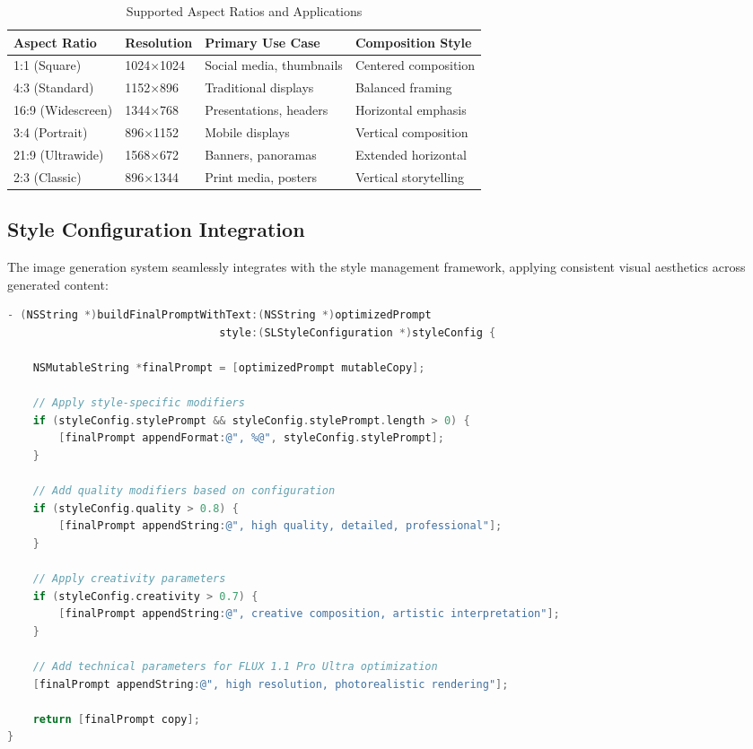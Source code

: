 \begin{table}[H]
\centering
\caption{Supported Aspect Ratios and Applications}
\label{tab:aspect_ratios}
{\begin{tabular}{llll}
\toprule
\textbf{Aspect Ratio} & \textbf{Resolution} & \textbf{Primary Use Case} & \textbf{Composition Style} \\
\midrule
1:1 (Square) & 1024×1024 & Social media, thumbnails & Centered composition \\
4:3 (Standard) & 1152×896 & Traditional displays & Balanced framing \\
16:9 (Widescreen) & 1344×768 & Presentations, headers & Horizontal emphasis \\
3:4 (Portrait) & 896×1152 & Mobile displays & Vertical composition \\
21:9 (Ultrawide) & 1568×672 & Banners, panoramas & Extended horizontal \\
2:3 (Classic) & 896×1344 & Print media, posters & Vertical storytelling \\
\bottomrule
\end{tabular}}
\end{table}

\subsection{Style Configuration Integration}

The image generation system seamlessly integrates with the style management framework, applying consistent visual aesthetics across generated content:

\begin{lstlisting}[language=C,basicstyle=\footnotesize\ttfamily,frame=single,breaklines=true,columns=flexible,caption={Style Configuration Application},label={lst:style_integration}]
- (NSString *)buildFinalPromptWithText:(NSString *)optimizedPrompt 
                                 style:(SLStyleConfiguration *)styleConfig {
    
    NSMutableString *finalPrompt = [optimizedPrompt mutableCopy];
    
    // Apply style-specific modifiers
    if (styleConfig.stylePrompt && styleConfig.stylePrompt.length > 0) {
        [finalPrompt appendFormat:@", %@", styleConfig.stylePrompt];
    }
    
    // Add quality modifiers based on configuration
    if (styleConfig.quality > 0.8) {
        [finalPrompt appendString:@", high quality, detailed, professional"];
    }
    
    // Apply creativity parameters
    if (styleConfig.creativity > 0.7) {
        [finalPrompt appendString:@", creative composition, artistic interpretation"];
    }
    
    // Add technical parameters for FLUX 1.1 Pro Ultra optimization
    [finalPrompt appendString:@", high resolution, photorealistic rendering"];
    
    return [finalPrompt copy];
}
\end{lstlisting}




